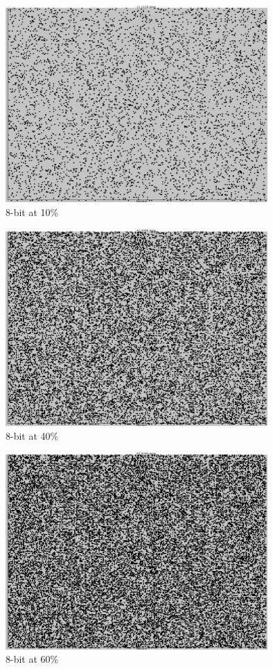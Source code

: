\documentclass[a4paper,11pt,titlepage]{article}
\begin{document}
\begin{figure}[htbp]
   \centering
   \includegraphics[width=10cm]{snapshot7.png}
   \caption{8-bit at 10\%}
   \label{Figure:figex}
\end{figure}
\begin{figure}[htbp]
   \centering
   \includegraphics[width=10cm]{snapshot8.png}
   \caption{8-bit at 40\%}
   \label{Figure:figex}
\end{figure}
\begin{figure}[htbp]
   \centering
   \includegraphics[width=10cm]{snapshot9.png}
   \caption{8-bit at 60\%}
   \label{Figure:figex}
\end{figure}
\end{document}
